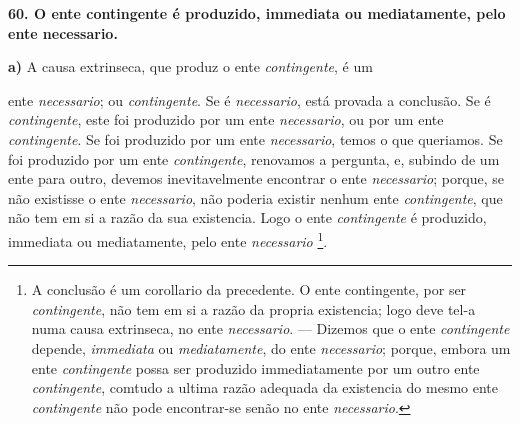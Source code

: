 
\textbf{60. O ente contingente é produzido, immediata ou mediatamente, pelo ente necessario.}

\textbf{a)} A causa extrinseca, que produz o ente \emph{contingente}, é um

ente \emph{necessario}; ou \emph{contingente}. Se é \emph{necessario}, está provada a conclusão. Se é \emph{contingente}, este foi produzido por um ente \emph{necessario}, ou por um ente \emph{contingente}. Se foi produzido por um ente \emph{necessario}, temos o que queriamos. Se foi produzido por um ente \emph{contingente}, renovamos a pergunta, e, subindo de um ente para outro, devemos inevitavelmente encontrar o ente \emph{necessario}; porque, se não existisse o ente \emph{necessario}, não poderia existir nenhum ente \emph{contingente}, que não tem em si a razão da sua existencia. Logo o ente \emph{contingente} é produzido, immediata ou mediatamente, pelo ente \emph{necessario} \footnote{A conclusão é um corollario da precedente. O ente contingente, por ser \emph{contingente}, não tem em si a razão da propria existencia; logo deve tel-a numa causa extrinseca, no ente \emph{necessario}. --- Dizemos que o ente \emph{contingente} depende, \emph{immediata} ou \emph{mediatamente}, do ente \emph{necessario}; porque, embora um ente \emph{contingente} possa ser produzido immediatamente por um outro ente \emph{contingente}, comtudo a ultima razão adequada da existencia do mesmo ente \emph{contingente} não pode encontrar-se senão no ente \emph{necessario}.}.

